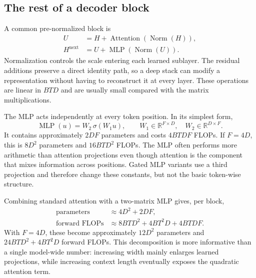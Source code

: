 \subsection{The rest of a decoder block}

A common pre-normalized block is
\begin{align}
  U &= H+\operatorname{Attention}(\operatorname{Norm}(H)),\\
  H^{\mathrm{next}} &= U+\operatorname{MLP}(\operatorname{Norm}(U)).
\end{align}
Normalization controls the scale entering each learned sublayer. The residual additions
preserve a direct identity path, so a deep stack can modify a representation without
having to reconstruct it at every layer. These operations are linear in $BTD$ and are
usually small compared with the matrix multiplications.

The MLP acts independently at every token position. In its simplest form,
\begin{equation}
  \operatorname{MLP}(u)=W_2\,\sigma(W_1u),
  \qquad W_1\in\mathbb{R}^{F\times D},\quad
  W_2\in\mathbb{R}^{D\times F}.
\end{equation}
It contains approximately $2DF$ parameters and costs $4BTDF$ FLOPs. If $F=4D$, this is
$8D^2$ parameters and $16BTD^2$ FLOPs. The MLP often performs more arithmetic than
attention projections even though attention is the component that mixes information
across positions. Gated MLP variants use a third projection and therefore change these
constants, but not the basic token-wise structure.

Combining standard attention with a two-matrix MLP gives, per block,
\begin{align}
  \operatorname{parameters} &\approx 4D^2+2DF,\\
  \operatorname{forward\ FLOPs} &\approx 8BTD^2+4BT^2D+4BTDF.
\end{align}
With $F=4D$, these become approximately $12D^2$ parameters and
$24BTD^2+4BT^2D$ forward FLOPs. This decomposition is more informative than a single
model-wide number: increasing width mainly enlarges learned projections, while increasing
context length eventually exposes the quadratic attention term.
